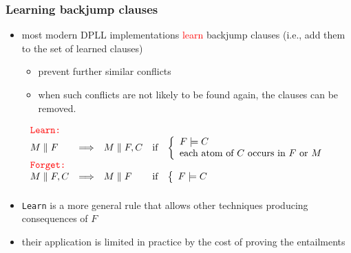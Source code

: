 \documentclass[smaller]{beamer}
\newcommand{\state}[2]{{#1\parallel #2}}
\newcommand{\red}[1]{\textcolor{red}{#1}}
\begin{document}
\begin{frame}
\frametitle{Learning backjump clauses}
\begin{itemize}
\item most modern DPLL implementations \red{learn} backjump clauses (i.e., add them to the set of learned clauses)
\begin{itemize}
	\item prevent further similar conflicts
	\item when such conflicts are not likely to be found again, the clauses can be removed.
\end{itemize}
\end{itemize}
\[
\begin{array}{lclcl}
\red{\mbox{\tt Learn:}} \\
\state{M}{F}&\Longrightarrow& \state{M}{F,C} &\mbox{if} &\left\{\begin{array}{l}
												F\models C\\
												\mbox{each atom of $C$ occurs in $F$ or $M$}															\end{array}\right. \\[2mm]
\red{\mbox{\tt Forget:}} \\
\state{M}{F,C}&\Longrightarrow& \state{M}{F} &\mbox{if} &\left\{\begin{array}{l}
												F\models C\\
												\end{array}\right. \\[2mm]
\end{array}
\]
\begin{itemize}
	\item {\tt Learn} is a more general rule that allows other techniques producing consequences of $F$
	\item their application is limited in practice by the cost of proving the entailments
\end{itemize}
\end{frame}
\end{document}
